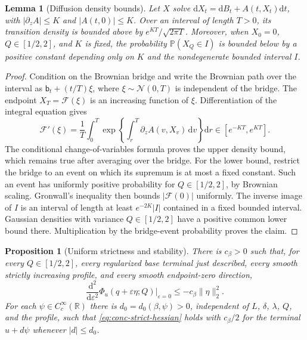 \documentclass[11pt,a4paper]{article}
\numberwithin{equation}{section}
\newtheorem{lemma}[theorem]{Lemma}
\newtheorem{proposition}[theorem]{Proposition}
\theoremstyle{definition}
\theoremstyle{remark}
\newcommand{\Prob}{\mathbb P}
\newcommand{\R}{\mathbb R}
\newcommand{\dd}{\mathrm d}
\newcommand{\cN}{\mathcal N}
\begin{document}
\begin{lemma}[Diffusion density bounds]
\label{lem:conc-density}
Let $X$ solve $\dd X_t=\dd B_t+A(t,X_t)\dd t$, with
$|\partial_zA|\leq K$ and $|A(t,0)|\leq K$.
Over an interval of length $T>0$, its transition density is bounded above
by $e^{KT}/\sqrt{2\pi T}$.  Moreover, when $X_0=0$,
$Q\in[1/2,2]$, and $K$ is fixed, the probability
$\Prob(X_Q\in I)$ is bounded below by a positive constant depending
only on $K$ and the nondegenerate bounded interval $I$.
\end{lemma}

\begin{proof}
Condition on the Brownian bridge and write the Brownian path over the
interval as $\mathsf b_t+(t/T)\xi$, where $\xi\sim\cN(0,T)$ is independent
of the bridge.  The endpoint $X_T=\mathcal F(\xi)$ is an increasing
function of $\xi$.  Differentiation of the integral equation gives
\[
 \mathcal F'(\xi)=\frac1T\int_0^T
       \exp\left\{\int_r^T\partial_zA(v,X_v)\,\dd v\right\}\dd r
       \in[e^{-KT},e^{KT}].
\]
The conditional change-of-variables formula proves the upper density
bound, which remains true after averaging over the bridge.
For the lower bound, restrict the bridge to an event on which its supremum
is at most a fixed constant.  Such an event has uniformly positive
probability for $Q\in[1/2,2]$, by Brownian scaling.  Gronwall's inequality
then bounds $|\mathcal F(0)|$ uniformly.  The inverse image of $I$ is an
interval of length at least $e^{-2K}|I|$ contained in a fixed bounded
interval.  Gaussian densities with variance $Q\in[1/2,2]$ have a positive
common lower bound there.  Multiplication by the bridge-event probability
proves the claim.
\end{proof}

\begin{proposition}[Uniform strictness and stability]
\label{prop:conc-stability}
There is $c_\beta>0$ such that, for every $Q\in[1/2,2]$, every regularized
base terminal just described, every smooth strictly increasing profile,
and every smooth endpoint-zero direction,
\begin{equation}
 \frac{\dd^2}{\dd\varepsilon^2}
 \Phi_u(q+\varepsilon\eta;Q)\big|_{\varepsilon=0}
 \leq-c_\beta\|\eta\|_2^2.
 \label{eq:conc-strict-hessian}
\end{equation}
For each $\psi\in C_c^\infty(\R)$ there is $d_0=d_0(\beta,\psi)>0$,
independent of $L$, $\delta$, $\lambda$, $Q$, and the profile, such that
\eqref{eq:conc-strict-hessian} holds with $c_\beta/2$ for the terminal
$u+d\psi$ whenever $|d|\leq d_0$.
\end{proposition}
\end{document}
